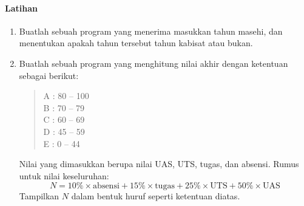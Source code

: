 \documentclass[../main.tex]{subfiles}
\begin{document}
\paragraph{Latihan}
\begin{enumerate}
  \item Buatlah sebuah program yang menerima masukkan tahun masehi, dan menentukan
  apakah tahun tersebut tahun kabisat atau bukan.
  \item Buatlah sebuah program yang menghitung nilai akhir dengan ketentuan
  sebagai berikut:
  \begin{verse}
    A : 80 -- 100\\
    B : 70 -- 79\\
    C : 60 -- 69\\
    D : 45 -- 59\\
    E : 0  -- 44\\
  \end{verse}
  Nilai yang dimasukkan berupa nilai UAS, UTS, tugas, dan absensi. Rumus untuk
  nilai keseluruhan:
  \[
    N = 10\% \times \textrm{absensi} + 15\% \times \textrm{tugas} + 25\% \times
    \textrm{UTS} + 50\% \times \textrm{UAS}
  \]
  Tampilkan \(N\) dalam bentuk huruf seperti ketentuan diatas.
\end{enumerate}
\end{document}
